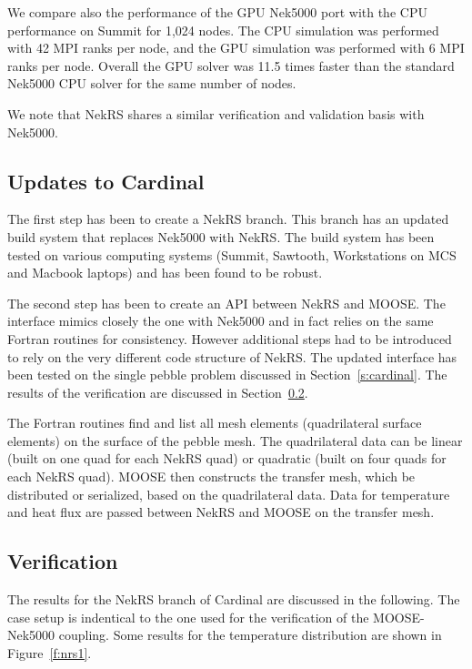 We compare also the performance of the GPU Nek5000 port with the CPU performance on Summit for 1,024 nodes. The CPU simulation was performed with 42 MPI ranks per node, and the GPU simulation was performed with 6 MPI ranks per node. Overall the GPU solver was 11.5 times faster than the standard Nek5000 CPU solver for the same number of nodes.

We note that NekRS shares a similar verification and validation basis with Nek5000.

\subsection{Updates to Cardinal}

The first step has been to create a NekRS branch. This branch has an updated build system that replaces Nek5000 with NekRS. The build system has been tested on various computing systems (Summit, Sawtooth, Workstations on MCS and Macbook laptops) and has been found to be robust.

The second step has been to create an API between NekRS and MOOSE. The interface mimics closely the one with Nek5000 and in fact relies on the same Fortran routines for consistency. However additional steps had to be introduced to rely on the very different code structure of NekRS. The updated interface has been tested on the single pebble problem discussed in Section~\ref{s:cardinal}. The results of the verification are discussed in Section~\ref{s:nrs1}.

The Fortran routines find and list all mesh elements (quadrilateral surface elements) on the surface of the pebble mesh. The quadrilateral data can be linear (built on one quad for each NekRS quad) or quadratic (built on four quads for each NekRS quad). MOOSE then constructs the transfer mesh, which be distributed or serialized, based on the quadrilateral data. Data for temperature and heat flux are passed between NekRS and MOOSE on the transfer mesh.

\subsection{Verification}
\label{s:nrs1}

The results for the NekRS branch of Cardinal are discussed in the following. The case setup is indentical to the one used for the verification of the MOOSE-Nek5000 coupling. Some results for the temperature distribution are shown in Figure~\ref{f:nrs1}.


